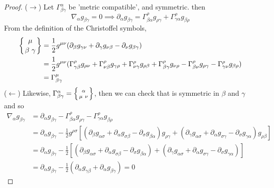 \documentclass[a4paper]{article}
\theoremstyle{new}
\begin{document}
\begin{proof}
($\rightarrow$) Let $\Gamma_{\beta\gamma}^\alpha$ be 'metric compatible', and symmetric. then
$$\nabla_\alpha g_{\beta\gamma}=0\implies\partial_\alpha g_{\beta\gamma}=\Gamma_{\beta\alpha}^\rho g_{\rho\gamma}+\Gamma_{\gamma\alpha}^\rho g_{\beta\rho}$$
From the definition of the Christoffel symbols,
\begin{align}
\left \{ {\mu \atop
\beta\ \gamma}\right \}&=\frac{1}{2}g^{\mu\nu}(\partial_\beta g_{\gamma\nu}+\partial_\gamma g_{\nu\beta}-\partial_\nu g_{\beta\gamma})\nonumber\\&=\frac{1}{2}g^{\mu\nu}(\Gamma^\rho_{\gamma\beta}g_{\rho\nu}+\Gamma_{\nu\beta}^\rho g_{\gamma\rho}+\Gamma_{\nu\gamma}^\rho g_{\rho\beta}+\Gamma_{\beta\gamma}^\rho g_{\nu\rho}-\Gamma_{\beta\nu}^\rho g_{\rho\gamma}-\Gamma_{\gamma\nu}^\rho g_{\beta\rho})\nonumber\\&=\Gamma_{\beta\gamma}^\mu
\end{align}
($\leftarrow$) Likewise, $\Gamma_{\beta\gamma}^\alpha=\left \{ {\alpha \atop
\mu\ \nu}\right \}$, then we can check that is symmetric in $\beta$ and $\gamma$ and so 
\begin{align}
    \nabla_\alpha g_{\beta\gamma}&=\partial_\alpha g_{\beta\gamma}-\Gamma_{\beta\alpha}^\rho g_{\rho\gamma}-\Gamma_{\gamma\alpha}^\rho g_{\beta\rho}\nonumber\\&=\partial_\alpha g_{\beta\gamma}-\frac{1}{2}g^{\rho\sigma}[(\partial_\beta g_{\alpha\sigma}+\partial_\alpha g_{\sigma\beta}-\partial_\sigma g_{\beta\alpha})g_{\rho\gamma}+(\partial_\gamma g_{\alpha\sigma}+\partial_\alpha g_{\sigma\gamma}-\partial_\sigma g_{\gamma\alpha})g_{\rho\beta}]\nonumber\\&=\partial_\alpha g_{\beta\gamma}-\frac{1}{2}[(\partial_\beta g_{\alpha\sigma}+\partial_\alpha g_{\sigma\beta}-\partial_\sigma g_{\beta\alpha})+(\partial_\gamma g_{\alpha\sigma}+\partial_\alpha g_{\sigma\gamma}-\partial_\sigma g_{\gamma\alpha})]\nonumber\\&=\partial_\alpha g_{\beta\gamma}-\frac{1}{2}(\partial_\alpha g_{\gamma\beta}+\partial_\alpha g_{\beta\gamma})=0\nonumber
\end{align}
\end{proof}
\end{document}
